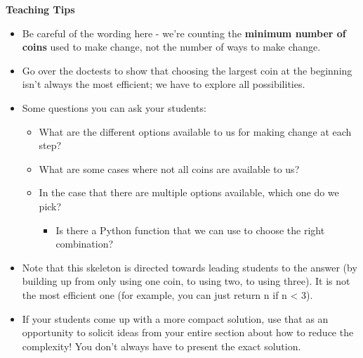 \begin{blocksection}
 \begin{guide}
   \textbf{Teaching Tips}
   \begin{itemize}
       \item Be careful of the wording here - we’re counting the \textbf{minimum number of coins} used to make change, not the number of ways to make change.
       \item Go over the doctests to show that choosing the largest coin at the beginning isn't always the most efficient; we have to explore all possibilities. 
       \item Some questions you can ask your students: 
       \begin{itemize}
        \item What are the different options available to us for making change at each step? 
        \item What are some cases where not all coins are available to us? 
        \item In the case that there are multiple options available, which one do we pick? 
        \begin{itemize}
          \item Is there a Python function that we can use to choose the right combination?
        \end{itemize}
       \end{itemize}
       \item Note that this skeleton is directed towards leading students to the answer (by building up from only using one coin, to using two, to using three). It is not the most efficient one (for example, you can just return n if n < 3). 
       \item If your students come up with a more compact solution, use that as an opportunity to solicit ideas from your entire section about how to reduce the complexity! You don't always have to present the exact solution.
   \end{itemize}
 \end{guide}
 \end{blocksection}
